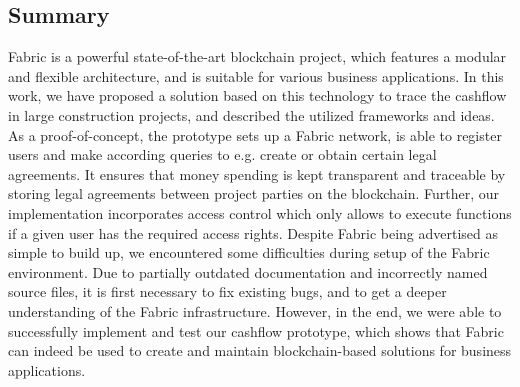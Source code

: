 
\subsection{Summary}
Fabric is a powerful state-of-the-art blockchain project, which features a modular and flexible architecture, and is suitable for various business applications. 
In this work, we have proposed a solution based on this technology to trace the cashflow in large construction projects, and described the utilized frameworks and ideas. As a proof-of-concept, the prototype sets up a Fabric network, is able to register users and make according queries to e.g. create or obtain certain legal agreements. It ensures that money spending is kept transparent and traceable by storing legal agreements between project parties on the blockchain. Further, our implementation incorporates access control which only allows to execute functions if a given user has the required access rights.
Despite Fabric being advertised as simple to build up, we encountered some difficulties during setup of the Fabric environment. Due to partially outdated documentation and incorrectly named source files, it is first necessary to fix existing bugs, and to get a deeper understanding of the Fabric infrastructure. However, in the end, we were able to successfully implement and test our cashflow prototype, which shows that Fabric can indeed be used to create and maintain blockchain-based solutions for business applications. 

